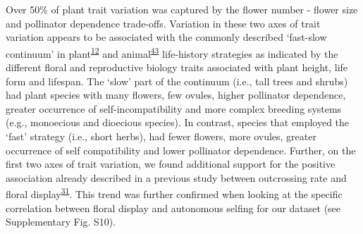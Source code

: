 \documentclass[12pt,a4paper,]{article}
\begin{document}
Over 50\% of plant trait variation was captured by the flower number -
flower size and pollinator dependence trade-offs. Variation in these two
axes of trait variation appears to be associated with the commonly
described `fast-slow continuum' in
plant\textsuperscript{\protect\hyperlink{ref-salguero2016}{12}} and
animal\textsuperscript{\protect\hyperlink{ref-healy2019}{43}}
life-history strategies as indicated by the different floral and
reproductive biology traits associated with plant height, life form and
lifespan. The `slow' part of the continuum (i.e., tall trees and shrubs)
had plant species with many flowers, few ovules, higher pollinator
dependence, greater occurrence of self-incompatibility and more complex
breeding systems (e.g., monoecious and dioecious species). In contrast,
species that employed the `fast' strategy (i.e., short herbs), had fewer
flowers, more ovules, greater occurrence of self compatibility and lower
pollinator dependence. Further, on the first two axes of trait
variation, we found additional support for the positive association
already described in a previous study between outcrossing rate and
floral
display\textsuperscript{\protect\hyperlink{ref-goodwillie2010}{31}}.
This trend was further confirmed when looking at the specific
correlation between floral display and autonomous selfing for our
dataset (see Supplementary Fig. S10).
\end{document}

